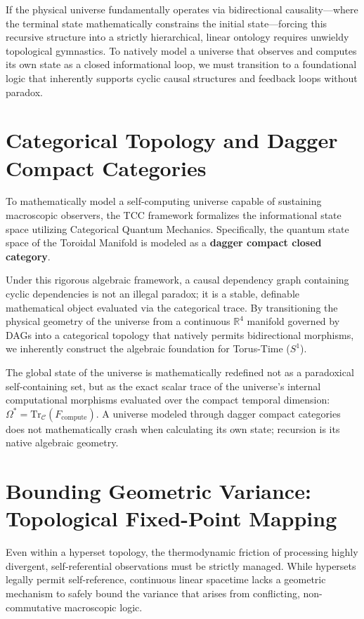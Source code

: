 \documentclass[12pt,openany]{book}
\theoremstyle{plain}
\theoremstyle{definition}
\theoremstyle{remark}
\begin{document}
If the physical universe fundamentally operates via bidirectional causality---where the terminal state mathematically constrains the initial state---forcing this recursive structure into a strictly hierarchical, linear ontology requires unwieldy topological gymnastics. To natively model a universe that observes and computes its own state as a closed informational loop, we must transition to a foundational logic that inherently supports cyclic causal structures and feedback loops without paradox.

\section{Categorical Topology and Dagger Compact Categories}

To mathematically model a self-computing universe capable of sustaining macroscopic observers, the TCC framework formalizes the informational state space utilizing Categorical Quantum Mechanics. Specifically, the quantum state space of the Toroidal Manifold is modeled as a \textbf{dagger compact closed category}.

Under this rigorous algebraic framework, a causal dependency graph containing cyclic dependencies is not an illegal paradox; it is a stable, definable mathematical object evaluated via the categorical trace. By transitioning the physical geometry of the universe from a continuous $\mathbb{R}^4$ manifold governed by DAGs into a categorical topology that natively permits bidirectional morphisms, we inherently construct the algebraic foundation for Torus-Time ($S^1$).

The global state of the universe is mathematically redefined not as a paradoxical self-containing set, but as the exact scalar trace of the universe's internal computational morphisms evaluated over the compact temporal dimension: $\Omega^* = \text{Tr}_{\mathcal{C}}(F_{\text{compute}})$. A universe modeled through dagger compact categories does not mathematically crash when calculating its own state; recursion is its native algebraic geometry.

\section{Bounding Geometric Variance: Topological Fixed-Point Mapping}

Even within a hyperset topology, the thermodynamic friction of processing highly divergent, self-referential observations must be strictly managed. While hypersets legally permit self-reference, continuous linear spacetime lacks a geometric mechanism to safely bound the variance that arises from conflicting, non-commutative macroscopic logic.
\end{document}

